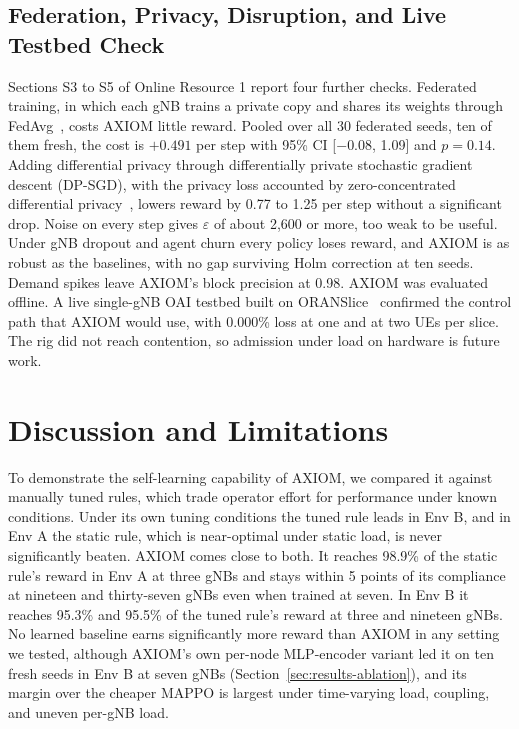 \documentclass[pdflatex,sn-basic,Numbered]{sn-jnl}
\begin{document}
\subsection{Federation, Privacy, Disruption, and Live Testbed Check}
Sections S3 to S5 of Online Resource 1 report four further checks. Federated training, in which each gNB trains a private copy and shares its weights through FedAvg~\cite{wen2023flsurvey}, costs AXIOM little reward. Pooled over all 30 federated seeds, ten of them fresh, the cost is $+0.491$ per step with 95\% CI [$-$0.08, 1.09] and $p=0.14$. Adding differential privacy through differentially private stochastic gradient descent (DP-SGD), with the privacy loss accounted by zero-concentrated differential privacy~\cite{elouadrhiri2022dp}, lowers reward by 0.77 to 1.25 per step without a significant drop. Noise on every step gives $\varepsilon$ of about 2{,}600 or more, too weak to be useful. Under gNB dropout and agent churn every policy loses reward, and AXIOM is as robust as the baselines, with no gap surviving Holm correction at ten seeds. Demand spikes leave AXIOM's block precision at 0.98. AXIOM was evaluated offline. A live single-gNB OAI testbed built on ORANSlice~\cite{cheng2024oranslice} confirmed the control path that AXIOM would use, with 0.000\% loss at one and at two UEs per slice. The rig did not reach contention, so admission under load on hardware is future work.

\section{Discussion and Limitations}
To demonstrate the self-learning capability of AXIOM, we compared it against manually tuned rules, which trade operator effort for performance under known conditions. Under its own tuning conditions the tuned rule leads in Env B, and in Env A the static rule, which is near-optimal under static load, is never significantly beaten. AXIOM comes close to both. It reaches 98.9\% of the static rule's reward in Env A at three gNBs and stays within 5 points of its compliance at nineteen and thirty-seven gNBs even when trained at seven. In Env B it reaches 95.3\% and 95.5\% of the tuned rule's reward at three and nineteen gNBs. No learned baseline earns significantly more reward than AXIOM in any setting we tested, although AXIOM's own per-node MLP-encoder variant led it on ten fresh seeds in Env B at seven gNBs (Section~\ref{sec:results-ablation}), and its margin over the cheaper MAPPO is largest under time-varying load, coupling, and uneven per-gNB load.
\end{document}
